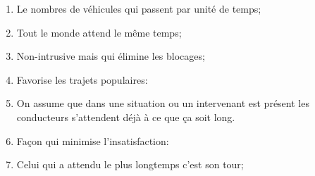 \documentclass{amsart}
\begin{document}
\hrulefill

\begin{enumerate}
    \item Le nombres de v\'ehicules qui passent par unit\'e de temps;
    \item Tout le monde attend le m\^eme temps;
    \item Non-intrusive mais qui \'elimine les blocages;
    \item Favorise les trajets populaires:
    \item[] On assume que dans une situation ou un intervenant est pr\'esent les conducteurs s'attendent d\'ej\`a \`a ce que \c ca soit long.
    \item Fa\c con qui minimise l'insatisfaction:
    \item Celui qui a attendu le plus longtemps c'est son tour;
\end{enumerate}
\end{document}
